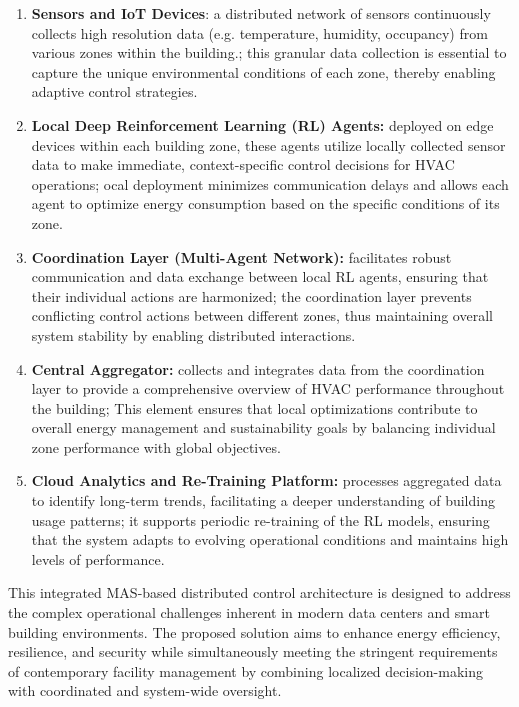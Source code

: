 \documentclass{svproc}
\begin{document}
\begin{enumerate} 

\item \textbf{Sensors and IoT Devices}: a distributed network of sensors continuously collects high resolution data (e.g. temperature, humidity, occupancy) from various zones within the building.; this granular data collection is essential to capture the unique environmental conditions of each zone, thereby enabling adaptive control strategies.

\item \textbf{Local Deep Reinforcement Learning (RL) Agents:} deployed on edge devices within each building zone, these agents utilize locally collected sensor data to make immediate, context-specific control decisions for HVAC operations; ocal deployment minimizes communication delays and allows each agent to optimize energy consumption based on the specific conditions of its zone. 

\item \textbf{Coordination Layer (Multi-Agent Network):} facilitates robust communication and data exchange between local RL agents, ensuring that their individual actions are harmonized; the coordination layer prevents conflicting control actions between different zones, thus maintaining overall system stability by enabling distributed interactions.

\item \textbf{Central Aggregator:} collects and integrates data from the coordination layer to provide a comprehensive overview of HVAC performance throughout the building; This element ensures that local optimizations contribute to overall energy management and sustainability goals by balancing individual zone performance with global objectives. 

\item \textbf{Cloud Analytics and Re-Training Platform:} processes aggregated data to identify long-term trends, facilitating a deeper understanding of building usage patterns; it supports periodic re-training of the RL models, ensuring that the system adapts to evolving operational conditions and maintains high levels of performance. 

\end{enumerate}

This integrated MAS-based distributed control architecture is designed to address the complex operational challenges inherent in modern data centers and smart building environments. The proposed solution aims to enhance energy efficiency, resilience, and security while simultaneously meeting the stringent requirements of contemporary facility management by combining localized decision-making with coordinated and system-wide oversight.
\end{document}
